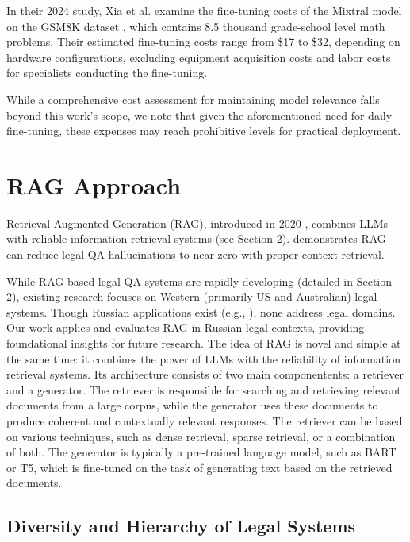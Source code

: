 In their 2024 study, Xia et al.\cite{xiaUnderstandingPerformanceEstimating2024} 
examine the fine-tuning costs of the Mixtral model \cite{jiangMixtralExperts2024} 
on the GSM8K dataset \cite{cobbeTrainingVerifiersSolve2021}, 
which contains 8.5 thousand grade-school level math problems. 
Their estimated fine-tuning costs range from \$17 to \$32, 
depending on hardware configurations, excluding equipment acquisition costs and 
labor costs for specialists conducting the fine-tuning.

While a comprehensive cost assessment for maintaining model relevance falls beyond this work's scope, we note that given the aforementioned need for daily fine-tuning, these expenses may reach prohibitive levels for practical deployment.

\section{RAG Approach}
Retrieval-Augmented Generation (RAG), introduced in 2020 \cite{lewisRetrievalAugmentedGenerationKnowledgeIntensive2020}, combines LLMs with reliable information retrieval systems (see Section 2). \cite{mageshHallucinationFreeAssessingReliability2024a} demonstrates RAG can reduce legal QA hallucinations to near-zero with proper context retrieval.

While RAG-based legal QA systems are rapidly developing (detailed in Section 2), existing research focuses on Western (primarily US and Australian) legal systems. Though Russian applications exist (e.g., \cite{kolaScienceCenter}), none address legal domains. Our work applies and evaluates RAG in Russian legal contexts, providing foundational insights for future research.
The idea of RAG is novel and simple at the same time: it combines the power of LLMs with the reliability of information retrieval systems.
Its architecture consists of two main componentents: a retriever and a generator.
The retriever is responsible for searching and retrieving relevant documents from a large corpus, while the generator uses these documents to produce coherent and contextually relevant responses.
The retriever can be based on various techniques, such as dense retrieval, sparse retrieval, or a combination of both.
The generator is typically a pre-trained language model, such as BART or T5, which is fine-tuned on the task of generating text based on the retrieved documents.

\subsection{Diversity and Hierarchy of Legal Systems}

